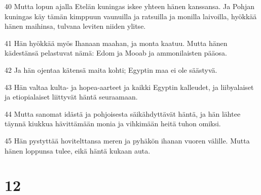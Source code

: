 \par 40 Mutta lopun ajalla Etelän kuningas iskee yhteen hänen kanssansa. Ja Pohjan kuningas käy tämän kimppuun vaunuilla ja ratsuilla ja monilla laivoilla, hyökkää hänen maihinsa, tulvana leviten niiden ylitse.
\par 41 Hän hyökkää myös Ihanaan maahan, ja monta kaatuu. Mutta hänen kädestänsä pelastuvat nämä: Edom ja Mooab ja ammonilaisten pääosa.
\par 42 Ja hän ojentaa kätensä maita kohti; Egyptin maa ei ole säästyvä.
\par 43 Hän valtaa kulta- ja hopea-aarteet ja kaikki Egyptin kalleudet, ja liibyalaiset ja etiopialaiset liittyvät häntä seuraamaan.
\par 44 Mutta sanomat idästä ja pohjoisesta säikähdyttävät häntä, ja hän lähtee täynnä kiukkua hävittämään monia ja vihkimään heitä tuhon omiksi.
\par 45 Hän pystyttää hovitelttansa meren ja pyhäkön ihanan vuoren välille. Mutta hänen loppunsa tulee, eikä häntä kukaan auta.

\chapter{12}

